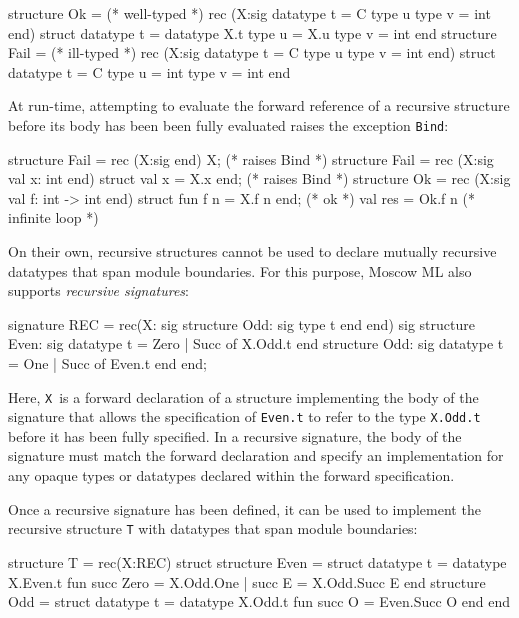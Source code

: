 \documentclass[fleqn,a4paper]{article}
\begin{document}
\begin{program}
structure Ok   = (* well-typed *)
                 rec (X:sig datatype t = C type u type v = int end)
                 struct datatype t = datatype X.t type u = X.u type v = int end 
structure Fail = (* ill-typed *)
                 rec (X:sig datatype t = C type u type v = int end)
                 struct datatype t = C type u = int type v = int end 
\end{program}

\noindent
At run-time, attempting to evaluate the forward reference of a recursive structure
before its body has been been fully evaluated raises the exception
\texttt{Bind}:

\begin{program}
structure Fail = rec (X:sig end) X;                            (* raises Bind   *)
structure Fail = rec (X:sig val x: int end) 
                 struct val x = X.x end;                       (* raises Bind   *)
structure Ok = rec (X:sig val f: int -> int end) 
               struct fun f n = X.f n  end;                    (* ok            *)
val res = Ok.f n                                               (* infinite loop *)
\end{program}

\noindent
On their own, recursive structures cannot be used to declare mutually
recursive datatypes that span module boundaries.  For this purpose,
Moscow ML also supports \emph{recursive signatures}:

\begin{program}
signature REC = rec(X: sig structure Odd: sig type t end end)
                sig structure Even: sig datatype t = Zero | Succ of X.Odd.t end
                    structure  Odd: sig datatype t = One  | Succ of Even.t end
                end;
\end{program}

\noindent
Here, \texttt{X}\ is a forward declaration of a structure implementing
the body of the signature that allows the specification of
\texttt{Even.t} to refer to the type \texttt{X.Odd.t} before it has
been fully specified.  In a recursive signature, the body of the
signature must match the forward declaration and specify an
implementation for any opaque types or datatypes declared within the
forward specification.

Once a recursive signature has been defined, it can be used to
implement the recursive structure \texttt{T} with datatypes that span
module boundaries:

\begin{program}
structure T = rec(X:REC)
              struct structure Even = struct datatype t = datatype X.Even.t 
                                             fun succ Zero = X.Odd.One 
                                               | succ E = X.Odd.Succ E
                                       end
                     structure Odd  = struct datatype t = datatype X.Odd.t
                                             fun succ O = Even.Succ O
                                      end
              end
\end{program}
\end{document}
